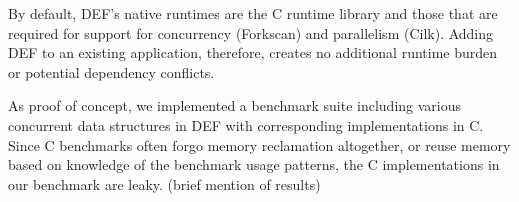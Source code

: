 By default, DEF's native runtimes are the C runtime library and those that are required for support for concurrency (Forkscan\cite{Forkscan}) and parallelism (Cilk\cite{BlumofeCilk}).  Adding DEF to an existing application, therefore, creates no additional runtime burden or potential dependency conflicts.

As proof of concept, we implemented a benchmark suite including various concurrent data structures in DEF with corresponding implementations in C.  Since C benchmarks often forgo memory reclamation altogether, or reuse memory based on knowledge of the benchmark usage patterns,\cite{Synchrobench, Scal} the C implementations in our benchmark are leaky.  (brief mention of results)

